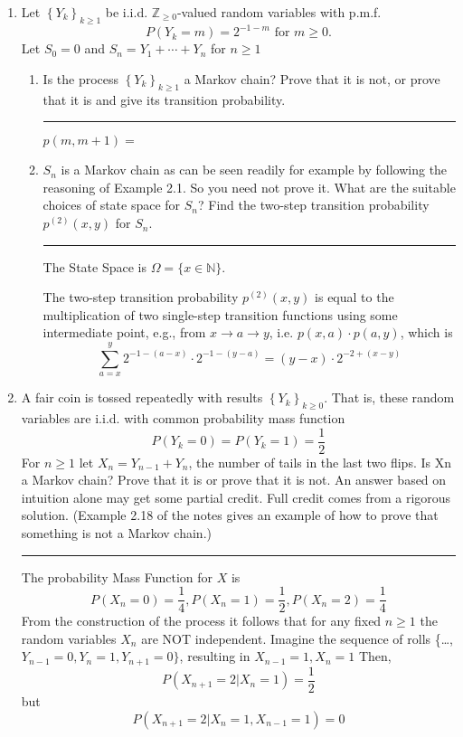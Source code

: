 \documentclass{article} %
\theoremstyle{plain}
\theoremstyle{case}
\begin{document}
\begin{enumerate}[label={\fbox{\textbf{Exercise \#\arabic* :}}}]
  \newpage
  \item Let $\left\{Y_k\right\}_{k \geq 1}$ be i.i.d. $\mathbb{Z}_{\geq 0}$-valued random variables with p.m.f.
    \[
      P\left(Y_k=m\right)=2^{-1-m} \text { for } m \geq 0 .
      \]
    Let $S_0=0$ and $S_n=Y_1+\cdots+Y_n$ for $n \geq 1$
    \begin{enumerate}
      \item Is the process $\left\{Y_k\right\}_{k \geq 1}$ a Markov chain? Prove that it is not, or prove that it is and give its transition probability.
\par\noindent\rule{\textwidth}{0.1pt}
      $p(m, m+1) = $
      \item  $S_n$ is a Markov chain as can be seen readily for example by following the reasoning of Example 2.1. So you need not prove it. What are the suitable choices of state space for $S_n$? Find the two-step transition probability $p^{(2)}(x, y)$ for $S_n$.
\par\noindent\rule{\textwidth}{0.1pt}
        The State Space is $\Omega = \{ x \in \mathbb{N} \}$.

       The two-step transition probability $p^{(2)}(x, y)$ is equal to 
       the multiplication of two single-step transition functions using
       some intermediate point, e.g., from
       $x \rightarrow a \rightarrow y$, i.e.
       $p(x,a) \cdot p(a,y)$, which is
       \[ \sum^{y}_{a=x} 2^{-1-(a-x)} \cdot 2^{-1-(y-a)} = (y-x) \cdot 2^{-2 + (x-y)} \]
    \end{enumerate} 
\newpage
  \item A fair coin is tossed repeatedly with results $\left\{Y_k\right\}_{k \geq 0}$. That is, these random variables are i.i.d.  with common
    probability mass function
    \[ P(Y_k=0) = P(Y_k =1) = \frac{1}{2}  \]
    For $n \geq 1$ let $X_n = Y_{n-1} + Y_n$, the number of tails in the
    last two flips. Is Xn a Markov chain?
    Prove that it is or prove that it is not. An answer based on intuition
    alone may get some partial credit. Full credit comes from a rigorous
    solution. (Example 2.18 of the notes gives an example of how to prove
    that something is not a Markov chain.)
\par\noindent\rule{\textwidth}{0.1pt}
    The probability Mass Function for $X$ is 
    \[ P(X_n=0) = \frac{1}{4},  P(X_n=1) = \frac{1}{2},
          P(X_n=2)= \frac{1}{4}    \]
    From the construction of the process it follows that for any
    fixed $n \geq 1$ the random variables $X_n$ are NOT independent.
    Imagine the sequence of rolls
    \{\dots, $Y_{n-1}=0, Y_{n}=1, Y_{n+1}=0\}$, resulting in 
    $X_{n-1}=1, X_{n}=1$
    Then,
    \[ P(X_{n+1} = 2 | X_n = 1) = \frac{1}{2}  \]
    but
    \[ P(X_{n+1} = 2 | X_n = 1, X_{n-1} = 1) = 0  \]
    
\end{enumerate}

%
%
\end{document}
